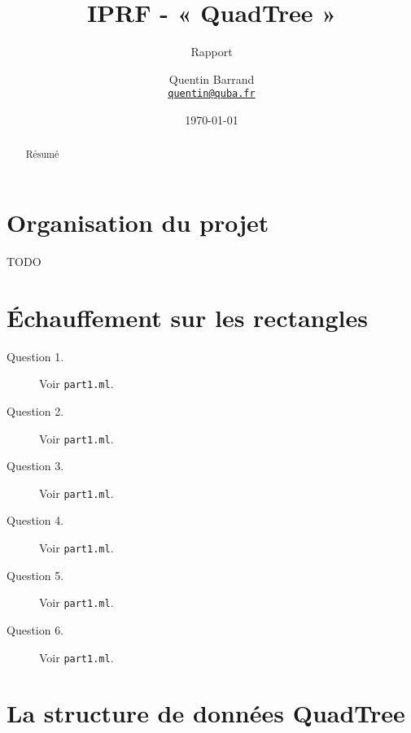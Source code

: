 \documentclass[11pt]{scrartcl}
\title{\textbf{IPRF - « QuadTree »}}
\subtitle{Rapport}
\author{Quentin Barrand\\
		\href{mailto:quentin@quba.fr}{\texttt{quentin@quba.fr}}}
\date{\today}
\begin{document}
\maketitle

\begin{abstract}
Résumé
\end{abstract}

\break

\section*{Organisation du projet}

TODO

\section{Échauffement sur les rectangles}

\begin{description}
\item[Question 1.] Voir \texttt{part1.ml}.
\item[Question 2.] Voir \texttt{part1.ml}.
\item[Question 3.] Voir \texttt{part1.ml}.
\item[Question 4.] Voir \texttt{part1.ml}.
\item[Question 5.] Voir \texttt{part1.ml}.
\item[Question 6.] Voir \texttt{part1.ml}.
\end{description}

\section{La structure de données QuadTree}
\end{document}
